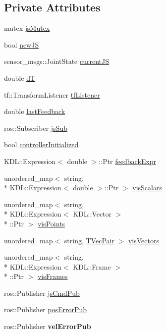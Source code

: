\subsection*{Private Attributes}
\begin{DoxyCompactItemize}
\item 
mutex \hyperlink{classGiskardActionServer_ac77cdbd8c3b81397c4be868e6711a458}{js\-Mutex}
\item 
bool \hyperlink{classGiskardActionServer_a6af586abe01f748597efea84d3d52e21}{new\-J\-S}
\item 
sensor\-\_\-msgs\-::\-Joint\-State \hyperlink{classGiskardActionServer_a06b9a0bfdf889fd886b4a10c6e0f7fe1}{current\-J\-S}
\item 
double \hyperlink{classGiskardActionServer_aca0c0257a6df8d3563fbdfdc39da1361}{d\-T}
\item 
tf\-::\-Transform\-Listener \hyperlink{classGiskardActionServer_ae7deb327e757759d21614df5adbc42f3}{tf\-Listener}
\item 
double \hyperlink{classGiskardActionServer_a17640817711388e121902779b66a3657}{last\-Feedback}
\item 
ros\-::\-Subscriber \hyperlink{classGiskardActionServer_a4197a9f1da3c9832d4bf7786bffa82ff}{js\-Sub}
\item 
bool \hyperlink{classGiskardActionServer_a46b468b15e97c46911fccfccf960ea76}{controller\-Initialized}
\item 
K\-D\-L\-::\-Expression$<$ double $>$\-::Ptr \hyperlink{classGiskardActionServer_ae68ed4306e57da20d00e80bf38f2e4f1}{feedback\-Expr}
\item 
unordered\-\_\-map$<$ string, \\*
K\-D\-L\-::\-Expression$<$ double $>$\-::Ptr $>$ \hyperlink{classGiskardActionServer_ae04063c56a2103232e3aa88283897666}{vis\-Scalars}
\item 
unordered\-\_\-map$<$ string, \\*
K\-D\-L\-::\-Expression$<$ K\-D\-L\-::\-Vector $>$\\*
\-::Ptr $>$ \hyperlink{classGiskardActionServer_a1094414df8bbfbcf469c88877f46d019}{vis\-Points}
\item 
unordered\-\_\-map$<$ string, \hyperlink{classGiskardActionServer_a49b67ed22398144efcae8cf2d6596f9e}{T\-Vec\-Pair} $>$ \hyperlink{classGiskardActionServer_abdad3a9c717ec286399323b152a8e64d}{vis\-Vectors}
\item 
unordered\-\_\-map$<$ string, \\*
K\-D\-L\-::\-Expression$<$ K\-D\-L\-::\-Frame $>$\\*
\-::Ptr $>$ \hyperlink{classGiskardActionServer_a018f9bc81967e035deb6cec695893dbc}{vis\-Frames}
\item 
ros\-::\-Publisher \hyperlink{classGiskardActionServer_a127b4e7740905cceb5a1ed2affd7fed3}{js\-Cmd\-Pub}
\item 
ros\-::\-Publisher \hyperlink{classGiskardActionServer_ac3e0344ceea38b8113c364b34c2353b2}{pos\-Error\-Pub}
\item 
\hypertarget{classGiskardActionServer_aed767b9547c953f6861a363925a41d88}{ros\-::\-Publisher {\bfseries vel\-Error\-Pub}}\label{classGiskardActionServer_aed767b9547c953f6861a363925a41d88}


\end{DoxyCompactItemize}
